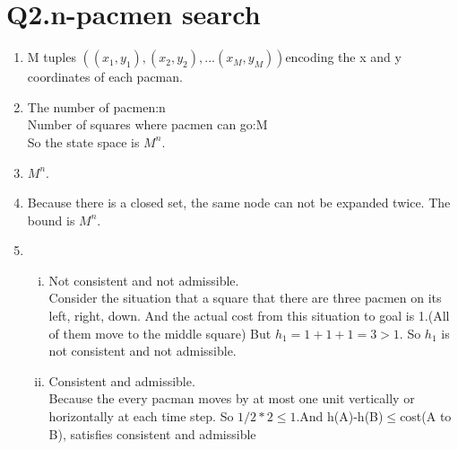 \documentclass[11pt]{article}
\newenvironment{qparts}{\begin{enumerate}[{(}a{)}]}{\end{enumerate}}
\begin{document}
\section*{Q2.n-pacmen search}
\begin{qparts}
\item
M tuples $((x_1,y_1),(x_2,y_2),...(x_M,y_M))$encoding the x and y coordinates of each pacman.
\item
The number of pacmen:n\\
Number of squares where pacmen can go:M\\
So  the state space is $M^n$.
\item
$M^n$.
\item
Because there is a closed set, the same node can not be expanded twice. The bound is $M^n$.
\item
\begin{enumerate}[(i)]
\item
Not consistent and not admissible.\\
Consider the situation that a square that there are three pacmen on its left, right, down. And the actual cost from this situation to goal is 1.(All of them move to the middle square) But  $h_1=1+1+1=3>1$. So $h_1$ is not consistent and not admissible.
\item
Consistent and admissible.\\
Because the every pacman moves by at most one unit vertically or horizontally at each time step. So $1/2*2\leq1$.And h(A)-h(B)$\leq$cost(A to B), satisfies consistent and admissible
\end{enumerate}
\end{qparts}
\end{document}
